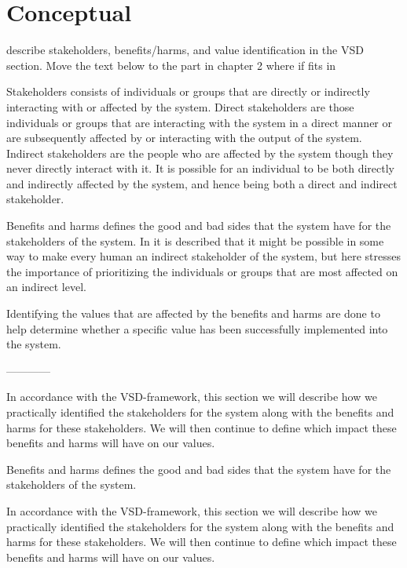 \section{Conceptual}

describe stakeholders, benefits/harms, and value identification in the VSD section. Move the text below to the part in chapter 2 where if fits in\newline

Stakeholders consists of individuals or groups that are directly or indirectly interacting with or affected by the system. Direct stakeholders are those individuals or groups that are interacting with the system in a direct manner or are subsequently affected by or interacting with the output of the system. Indirect stakeholders are the people who are affected by the system though they never directly interact with it. It is possible for an individual to be both directly and indirectly affected by the system, and hence being both a direct and indirect stakeholder.

Benefits and harms defines the good and bad sides that the system have for the stakeholders of the system. In \citep[p.12]{FriedmanVSDandIS} it is described that it might be possible in some way to make every human an indirect stakeholder of the system, but here stresses the importance of prioritizing the individuals or groups that are most affected on an indirect level. 


Identifying the values that are affected by the benefits and harms are done to help determine whether a specific value has been successfully implemented into the system. 

------------



In accordance with the VSD-framework, this section we will describe how we practically identified the stakeholders for the system along with the benefits and harms for these stakeholders. We will then continue to define which impact these benefits and harms will have on our values.

Benefits and harms defines the good and bad sides that the system have for the stakeholders of the system.


In accordance with the VSD-framework, this section we will describe how we practically identified the stakeholders for the system along with the benefits and harms for these stakeholders. We will then continue to define which impact these benefits and harms will have on our values.



